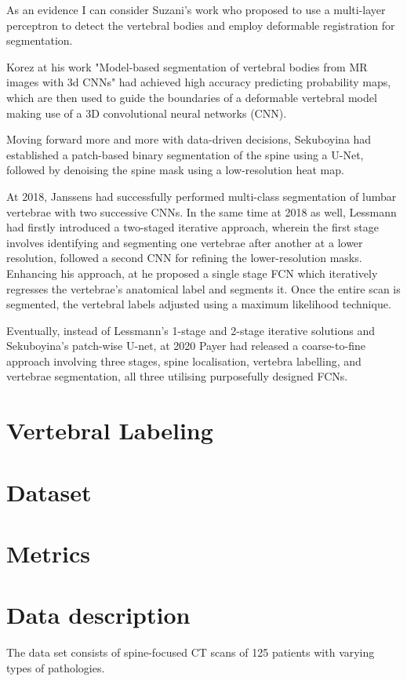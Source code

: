 As an evidence I can consider Suzani's work \cite{Suzani2015} who proposed to use a multi-layer perceptron to detect the vertebral bodies and employ deformable registration for segmentation. 

Korez \cite{Korez2016} at his work "Model-based segmentation of vertebral bodies from MR images with 3d CNNs" had achieved high accuracy predicting probability maps, which are then used to guide the boundaries of a deformable vertebral model making use of a 3D convolutional neural networks (CNN). 

Moving forward more and more with data-driven decisions, Sekuboyina \cite{Sekuboyina2018} had established a patch-based binary segmentation of the spine using a U-Net, followed by denoising the spine mask using a low-resolution heat map.

At 2018, Janssens \cite{Janssens2018} had successfully performed multi-class segmentation of lumbar vertebrae with two successive CNNs. In the same time at 2018 as well, Lessmann \cite{Lessmann2019} had firstly introduced a two-staged iterative approach, wherein the first stage involves identifying and segmenting one vertebrae after another at a lower resolution, followed a second CNN for refining the lower-resolution masks. Enhancing his approach, at \cite{Lessmann2019} he proposed a single stage FCN which iteratively regresses the vertebrae’s anatomical label and
segments it. Once the entire scan is segmented, the vertebral labels adjusted using a maximum likelihood
technique. 

Eventually, instead of Lessmann's 1-stage and 2-stage iterative solutions and Sekuboyina's patch-wise U-net, at 2020 Payer \cite{Payer2020} had released a coarse-to-fine approach involving three stages, spine localisation, vertebra labelling, and vertebrae segmentation, all three utilising purposefully designed FCNs.

\section{Vertebral Labeling}
\section{Dataset}
\section{Metrics}


\section{Data description}
The data set consists of spine-focused CT scans of 125 patients with varying types of pathologies. 

